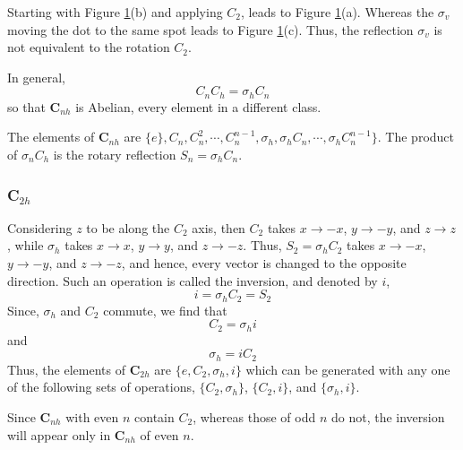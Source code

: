 \begin{figure}
\caption{}
\label{chap16-fig19}
\end{figure}

Starting with Figure \ref{chap16-fig19}(b) and applying $C_2$, leads
to Figure \ref{chap16-fig19}(a).  Whereas the $\sigma_v$ moving the
dot to the same spot leads to Figure \ref{chap16-fig19}(c).  Thus, the
reflection $\sigma_v$ is not equivalent to the rotation $C_2$.

In general,
\begin{equation}
C_nC_h = \sigma_h C_n
\label{chap16-eqno13}
\end{equation}
so that  {\bf C}$_{nh}$ is Abelian, every element in a different class.

The elements of {\bf C}$_{nh}$ are $\{e\}, C_n , C^2_n , \cdots , 
C_n^{n-1} , \sigma_h , \sigma_h C_n , \cdots , \sigma_h C_n^{n-1}\}$.  
The product of $\sigma_n C_h$ is the rotary reflection $S_n = 
\sigma_h C_n$.

\subsubsection{C$_{2h}$}

Considering $z$ to be along the $C_2$ axis, then $C_2$ takes $x 
\rightarrow -x$, $y \rightarrow -y$, and $z \rightarrow z$, while 
$\sigma_h$ takes $x \rightarrow x$, $y \rightarrow y$, and $z 
\rightarrow -z$.  Thus, $S_2 = \sigma_h C_2$ takes $x \rightarrow 
-x$, $y \rightarrow -y$, and $z \rightarrow -z$, and hence, every 
vector is changed to the opposite direction.  Such an operation is 
called the inversion, and denoted by $i$,
\begin{equation}
i = \sigma_h C_2 = S_2
\label{chap16-eqno14a}
\end{equation}
Since, $\sigma_h$ and $C_2$ commute, we find that
\begin{equation}
C_2 = \sigma_h i
\label{chap16-eqno14b}
\end{equation}
and
\begin{equation}
\sigma_h = i C_2
\label{chap16-eqno14c}
\end{equation}
Thus, the elements of {\bf C}$_{2h}$ are $\{e , C_2 , \sigma_h , i\}$ 
which can be generated with any one of the following sets of 
operations, $\{ C_2 , \sigma_h\}$, $\{C_2 , i\}$, and $\{ \sigma_h , 
i\}$.

Since {\bf C}$_{nh}$ with even $n$ contain $C_2$, whereas those of 
odd $n$ do not, the inversion will appear only in {\bf C}$_{nh}$ of 
even $n$.

